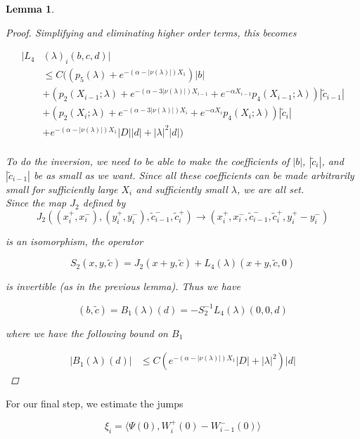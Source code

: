 \documentclass[12pt]{article}
\newtheorem{lemma}{Lemma}
\begin{document}
\begin{lemma}
\begin{proof}
Simplifying and eliminating higher order terms, this becomes

\begin{align*}
|L_4&(\lambda)_i(b, c, d)|\\
&\leq C \Big(
(p_5(\lambda) + e^{-(\alpha - |\nu(\lambda)|) X_1}) |b| \\
&+ (p_2(X_{i-1}; \lambda) + e^{-(\alpha - 3 |\nu(\lambda)|) X_{i-1}} + e^{-\alpha X_{i-1}} p_4(X_{i-1}; \lambda) ) |\tilde{c}_{i-1}| \\
&+ (p_2(X_i; \lambda) + e^{-(\alpha - 3 |\nu(\lambda)|) X_i} + e^{-\alpha X_i} p_4(X_i; \lambda) )|\tilde{c}_i| \\
&+ e^{-(\alpha - |\nu(\lambda)|) X_1} |D||d| + |\lambda|^2|d|
\Big) \\
\end{align*}

To do the inversion, we need to be able to make the coefficients of $|b|$, $|\tilde{c}_i|$, and $|\tilde{c}_{i-1}|$ be as small as we want. Since all these coefficients can be made arbitrarily small for sufficiently large $X_i$ and sufficiently small $\lambda$, we are all set. \\

Since the map $J_2$ defined by
\[
J_2( (x_i^+, x_i^-),(y_i^+, y_i^-), \tilde{c}_{i-1}^-, \tilde{c}_i^+ ) \rightarrow ( x_i^+, x_i^-, \tilde{c}_{i-1}^-, \tilde{c}_i^+, y_i^+ -  y_i^- )
\]

is an isomorphism, the operator

\[
S_2(x,y, \tilde{c}) = J_2(x+y, \tilde{c}) + L_4(\lambda)(x+y,\tilde{c}, 0)
\]

is invertible (as in the previous lemma). Thus we have

\begin{equation}
(b,\tilde{c}) = B_1(\lambda)(d) = -S_2^{-1} L_4(\lambda)(0, 0, d)
\end{equation}

where we have the following bound on $B_1$

\begin{align*}
|B_1(\lambda)(d)| &\leq C ( e^{-(\alpha - |\nu(\lambda)|) X_1} |D| + |\lambda|^2 )|d|
\end{align*}
 
\end{proof}
\end{lemma}

For our final step, we estimate the jumps

\begin{equation}
\xi_i = \langle \Psi(0), W_i^+(0) - W_{i-1}^-(0) \rangle 
\end{equation}
\end{document}
